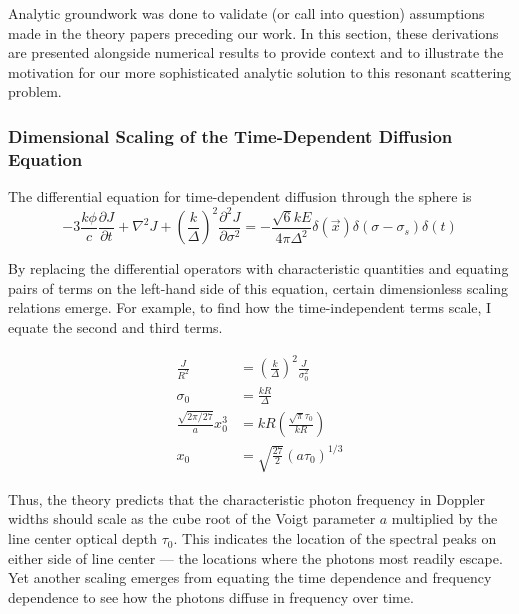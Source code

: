 \documentclass[onecolumn]{aastex63}
\begin{document}
Analytic groundwork was done to validate (or call into question) assumptions made in the theory papers preceding our work. In this section, these derivations are presented alongside numerical results to provide context and to illustrate the motivation for our more sophisticated analytic solution to this resonant scattering problem.

\subsubsection{Dimensional Scaling of the Time-Dependent Diffusion Equation} \label{sec:dimensionalanalysis}

The differential equation for time-dependent diffusion through the sphere is 
\begin{equation}
    -3 \frac{k\phi}{c} \frac{\partial J}{\partial t} + \nabla^2 J + \left( \frac{k}{\Delta} \right)^2 \frac{\partial^2 J}{\partial \sigma^2} = - \frac{\sqrt{6} kE}{4\pi \Delta^2} \delta(\vec{x}) \delta (\sigma - \sigma_s ) \delta (t)
        \label{timedependent}
\end{equation}

By replacing the differential operators with characteristic quantities and equating pairs of terms on the left-hand side of this equation, certain dimensionless scaling relations emerge. For example, to find how the time-independent terms scale, I equate the second and third terms.

\begin{equation}
\begin{split}
    \frac{J}{R^2} &= \left(\frac{k}{\Delta}\right)^2 \frac{J}{\sigma_0^2}\\
    \sigma_0 &= \frac{kR}{\Delta}\\
    \frac{\sqrt{2\pi/27}}{a}x_0^3 &= kR \left(\frac{\sqrt{\pi}\tau_0}{kR}\right)\\
    x_0 &= \sqrt{\frac{27}{2}}\left(a\tau_0\right)^{1/3}
    \end{split}
\end{equation}

\noindent Thus, the theory predicts that the characteristic photon frequency in Doppler widths should scale as the cube root of the Voigt parameter $a$ multiplied by the line center optical depth $\tau_0$. This indicates the location of the spectral peaks on either side of line center --- the locations where the photons most readily escape. Yet another scaling emerges from equating the time dependence and frequency dependence to see how the photons diffuse in frequency over time.
\end{document}
